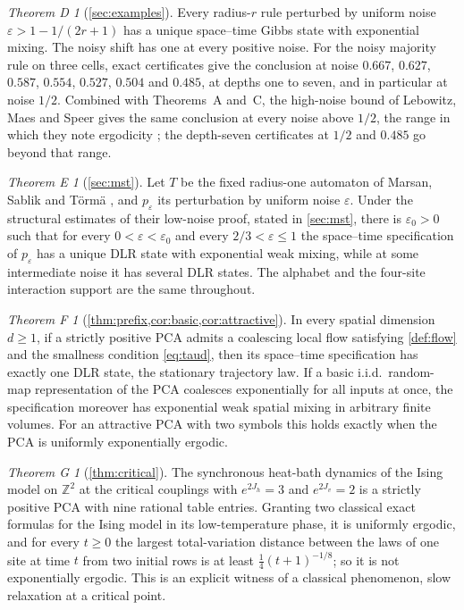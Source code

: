 \documentclass[11pt]{article}
\theoremstyle{plain}
\theoremstyle{definition}
\theoremstyle{remark}
\newtheorem*{mainD}{Theorem D}
\newtheorem*{mainE}{Theorem E}
\newtheorem*{mainF}{Theorem F}
\newtheorem*{mainG}{Theorem G}
\newcommand{\Z}{\mathbb{Z}}
\newcommand{\eps}{\varepsilon}
\begin{document}
\begin{mainD}[\cref{sec:examples}]
Every radius-$r$ rule perturbed by uniform noise $\eps>1-1/(2r+1)$ has a unique space--time Gibbs state with exponential mixing. The noisy shift has one at every positive noise. For the noisy majority rule on three cells, exact certificates give the conclusion at noise $0.667$, $0.627$, $0.587$, $0.554$, $0.527$, $0.504$ and $0.485$, at depths one to seven, and in particular at noise $1/2$. Combined with Theorems~A and~C, the high-noise bound of Lebowitz, Maes and Speer \cite[(4.1), (4.13)]{LMS90} gives the same conclusion at every noise above $1/2$, the range in which they note ergodicity \cite[Example~1.1]{LMS90}; the depth-seven certificates at $1/2$ and $0.485$ go beyond that range.
\end{mainD}

\begin{mainE}[\cref{sec:mst}]
Let $T$ be the fixed radius-one automaton of Marsan, Sablik and T\"orm\"a \cite{MST26}, and $p_\eps$ its perturbation by uniform noise $\eps$. Under the structural estimates of their low-noise proof, stated in \cref{sec:mst}, there is $\eps_0>0$ such that for every $0<\eps<\eps_0$ and every $2/3<\eps\le1$ the space--time specification of $p_\eps$ has a unique DLR state with exponential weak mixing, while at some intermediate noise it has several DLR states. The alphabet and the four-site interaction support are the same throughout.
\end{mainE}

\begin{mainF}[\cref{thm:prefix,cor:basic,cor:attractive}]
In every spatial dimension $d\ge1$, if a strictly positive PCA admits a coalescing local flow satisfying \cref{def:flow} and the smallness condition \eqref{eq:taud}, then its space--time specification has exactly one DLR state, the stationary trajectory law. If a basic i.i.d.\ random-map representation of the PCA coalesces exponentially for all inputs at once, the specification moreover has exponential weak spatial mixing in arbitrary finite volumes. For an attractive PCA with two symbols this holds exactly when the PCA is uniformly exponentially ergodic.
\end{mainF}

\begin{mainG}[\cref{thm:critical}]
The synchronous heat-bath dynamics of the Ising model on $\Z^2$ at the critical couplings with $e^{2J_h}=3$ and $e^{2J_v}=2$ is a strictly positive PCA with nine rational table entries. Granting two classical exact formulas for the Ising model in its low-temperature phase, it is uniformly ergodic, and for every $t\ge0$ the largest total-variation distance between the laws of one site at time $t$ from two initial rows is at least $\frac14(t+1)^{-1/8}$; so it is not exponentially ergodic. This is an explicit witness of a classical phenomenon, slow relaxation at a critical point.
\end{mainG}
\end{document}
